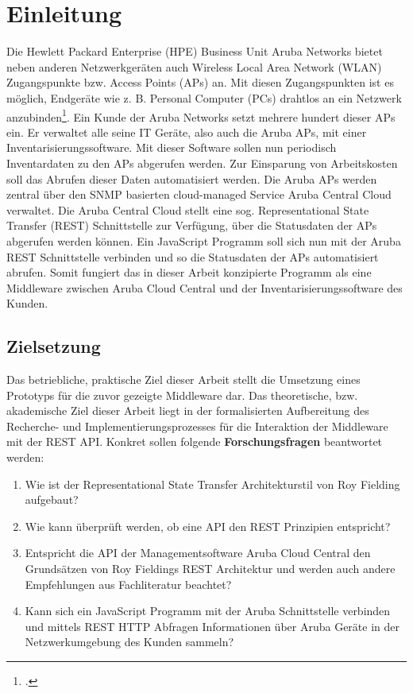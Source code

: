 \chapter{Einleitung}\label{chapter:einleitung}

Die Hewlett Packard Enterprise (HPE) Business Unit Aruba Networks bietet neben anderen Netzwerkgeräten auch Wireless Local Area Network (WLAN) Zugangspunkte bzw. Access Points (APs) an. Mit diesen Zugangspunkten ist es möglich, Endgeräte wie z. B. Personal Computer (PCs) drahtlos an ein Netzwerk anzubinden\footcite[Vgl. ][]{hewlett_packard_enterprise_development_lp_access_2021}. Ein Kunde der Aruba Networks setzt mehrere hundert dieser APs ein. Er verwaltet alle seine IT Geräte, also auch die Aruba APs, mit einer Inventarisierungssoftware. Mit dieser Software sollen nun periodisch Inventardaten zu den APs abgerufen werden. Zur Einsparung von Arbeitskosten soll das Abrufen dieser Daten automatisiert werden. Die Aruba APs werden zentral über den SNMP basierten cloud-managed Service Aruba Central Cloud verwaltet. Die Aruba Central Cloud stellt eine sog. Representational State Transfer (REST) Schnittstelle zur Verfügung, über die Statusdaten der APs abgerufen werden können. Ein JavaScript Programm soll sich nun mit der Aruba REST Schnittstelle verbinden und so die Statusdaten der APs automatisiert abrufen. Somit fungiert das in dieser Arbeit konzipierte Programm als eine Middleware zwischen Aruba Cloud Central und der Inventarisierungssoftware des Kunden. 

\section{Zielsetzung}\label{section:zielsetzung}

Das betriebliche, praktische Ziel dieser Arbeit stellt die Umsetzung eines Prototyps für die zuvor gezeigte Middleware dar. Das theoretische, bzw. akademische Ziel dieser Arbeit liegt in der formalisierten Aufbereitung des Recherche- und Implementierungsprozesses für die Interaktion der Middleware mit der REST API. Konkret sollen folgende \textbf{Forschungsfragen} beantwortet werden:

\begin{enumerate}
    \item Wie ist der Representational State Transfer Architekturstil von Roy Fielding aufgebaut?
    \item Wie kann überprüft werden, ob eine API den REST Prinzipien entspricht?
    \item Entspricht die API der Managementsoftware Aruba Cloud Central den Grundsätzen von Roy Fieldings REST Architektur und werden auch andere Empfehlungen aus Fachliteratur beachtet?
    \item Kann sich ein JavaScript Programm mit der Aruba Schnittstelle verbinden und mittels REST HTTP Abfragen Informationen über Aruba Geräte in der Netzwerkumgebung des Kunden sammeln?
\end{enumerate}

